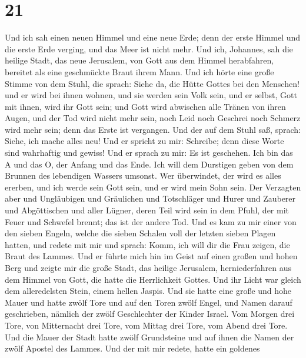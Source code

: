 \hypertarget{section-20}{%
\section{21}\label{section-20}}

 Und ich sah einen neuen Himmel und eine neue Erde; denn
der erste Himmel und die erste Erde verging, und das Meer ist nicht
mehr.  Und ich, Johannes, sah die heilige Stadt, das neue
Jerusalem, von Gott aus dem Himmel herabfahren, bereitet als eine
geschmückte Braut ihrem Mann.  Und ich hörte eine große
Stimme von dem Stuhl, die sprach: Siehe da, die Hütte Gottes bei den
Menschen! und er wird bei ihnen wohnen, und sie werden sein Volk sein,
und er selbst, Gott mit ihnen, wird ihr Gott sein;  und
Gott wird abwischen alle Tränen von ihren Augen, und der Tod wird nicht
mehr sein, noch Leid noch Geschrei noch Schmerz wird mehr sein; denn das
Erste ist vergangen.  Und der auf dem Stuhl saß, sprach:
Siehe, ich mache alles neu! Und er spricht zu mir: Schreibe; denn diese
Worte sind wahrhaftig und gewiss!  Und er sprach zu mir:
Es ist geschehen. Ich bin das A und das O, der Anfang und das Ende. Ich
will dem Durstigen geben von dem Brunnen des lebendigen Wassers umsonst.
 Wer überwindet, der wird es alles ererben, und ich werde
sein Gott sein, und er wird mein Sohn sein.  Der Verzagten
aber und Ungläubigen und Gräulichen und Totschläger und Hurer und
Zauberer und Abgöttischen und aller Lügner, deren Teil wird sein in dem
Pfuhl, der mit Feuer und Schwefel brennt; das ist der andere Tod.
 Und es kam zu mir einer von den sieben Engeln, welche die
sieben Schalen voll der letzten sieben Plagen hatten, und redete mit mir
und sprach: Komm, ich will dir die Frau zeigen, die Braut des Lammes.
 Und er führte mich hin im Geist auf einen großen und
hohen Berg und zeigte mir die große Stadt, das heilige Jerusalem,
herniederfahren aus dem Himmel von Gott,  die hatte die
Herrlichkeit Gottes. Und ihr Licht war gleich dem alleredelsten Stein,
einem hellen Jaspis.  Und sie hatte eine große und hohe
Mauer und hatte zwölf Tore und auf den Toren zwölf Engel, und Namen
darauf geschrieben, nämlich der zwölf Geschlechter der Kinder Israel.
 Vom Morgen drei Tore, von Mitternacht drei Tore, vom
Mittag drei Tore, vom Abend drei Tore.  Und die Mauer der
Stadt hatte zwölf Grundsteine und auf ihnen die Namen der zwölf Apostel
des Lammes.  Und der mit mir redete, hatte ein goldenes
